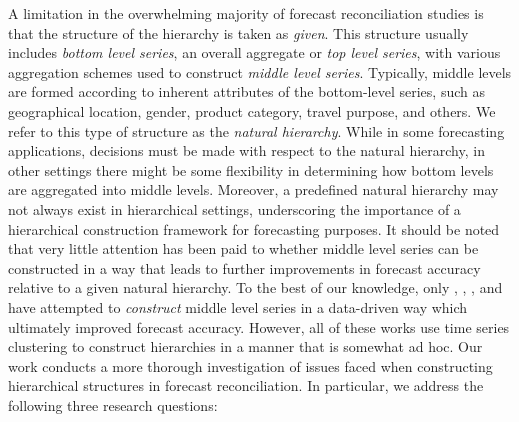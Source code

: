 \documentclass[a4paper,review,12pt,authoryear]{elsarticle}
\begin{document}
A limitation in the overwhelming majority of forecast reconciliation studies is that the structure of the hierarchy is taken as \textit{given}. This structure usually includes \textit{bottom level series}, an overall aggregate or \textit{top level series}, with various aggregation schemes used to construct \textit{middle level series}. Typically, middle levels are formed according to inherent attributes of the bottom-level series, such as geographical location, gender, product category, travel purpose, and others. We refer to this type of structure as the \textit{natural hierarchy}. While in some forecasting applications, decisions must be made with respect to the natural hierarchy, in other settings there might be some flexibility in determining how bottom levels are aggregated into middle levels. Moreover, a predefined natural hierarchy may not always exist in hierarchical settings, underscoring the importance of a hierarchical construction framework for forecasting purposes. It should be noted that very little attention has been paid to whether middle level series can be constructed in a way that leads to further improvements in forecast accuracy relative to a given natural hierarchy. To the best of our knowledge, only \cite{pangHierarchicalElectricityTime2018}, \cite{liForecastReconciliationApproach2019}, \cite{pangHierarchicalElectricityTime2022}, and \cite{matteraImprovingOutofSampleForecasts2023} have attempted to \textit{construct} middle level series in a data-driven way which ultimately improved forecast accuracy. However, all of these works use time series clustering to construct hierarchies in a manner that is somewhat ad hoc. Our work conducts a more thorough investigation of issues faced when  constructing hierarchical structures in forecast reconciliation. In particular, we address the following three research questions:%



\end{document}
